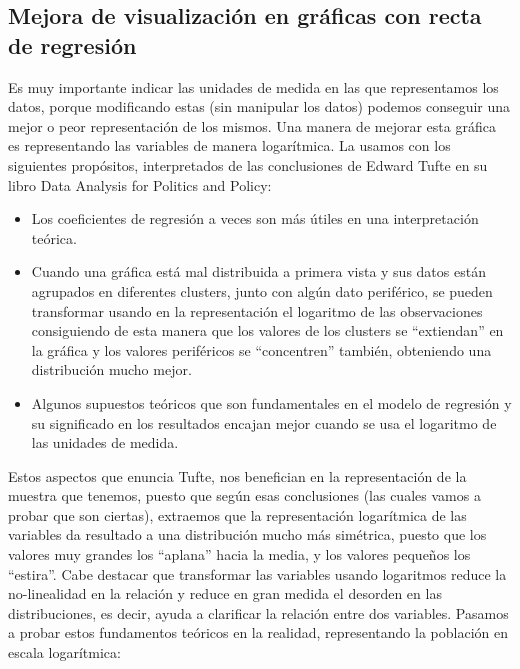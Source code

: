 \documentclass [a4paper] {article}
\begin{document}
\subsection{Mejora de visualización en gráficas con recta de regresión}
Es muy importante indicar las unidades de medida en las que representamos los datos, porque modificando estas (sin manipular los datos) 
podemos conseguir una mejor o peor representación de los mismos. Una manera de mejorar esta gráfica es representando las variables de manera 
logarítmica. La usamos con los siguientes propósitos, interpretados de las conclusiones de Edward Tufte en su libro Data Analysis for Politics and Policy: 
\begin{itemize}
  \item Los coeficientes de regresión a veces son más útiles en una interpretación teórica.
  \item Cuando una gráfica está mal distribuida a primera vista y sus datos están agrupados en diferentes clusters, junto con algún dato periférico, se pueden transformar usando en la representación el logaritmo de las observaciones consiguiendo de esta manera que los valores de los clusters se “extiendan” en la gráfica y los valores periféricos se “concentren” también, obteniendo una distribución mucho mejor.
  \item Algunos supuestos teóricos que son fundamentales en el modelo de regresión y su significado en los resultados encajan mejor cuando se usa el logaritmo de las unidades de medida.
\end{itemize}
Estos aspectos que enuncia Tufte, nos benefician en la representación de la muestra que tenemos, puesto que según esas conclusiones (las cuales vamos a probar 
que son ciertas), extraemos que la representación logarítmica de las variables da resultado a una distribución mucho más simétrica, 
puesto que los valores muy grandes los “aplana” hacia la media, y los valores pequeños los “estira”. 
Cabe destacar que transformar las variables usando logaritmos reduce la no-linealidad en la relación y reduce en gran medida el desorden 
en las distribuciones, es decir, ayuda a clarificar la relación entre dos variables. Pasamos a probar estos fundamentos teóricos en la realidad, 
representando la población en escala logarítmica: 
\end{document}
